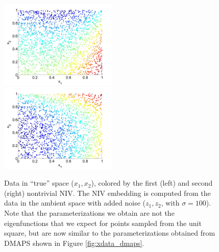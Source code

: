 \documentclass[12pt]{article}
\begin{document}
\begin{figure}[htb]
\includegraphics[width=0.5\textwidth]{xdata_noise2_colored_NIV1}
\includegraphics[width=0.5\textwidth]{xdata_noise2_colored_NIV2}
\caption{Data in ``true'' space ($x_1, x_2$), colored by the first (left) and second (right) nontrivial NIV. The NIV embedding is computed from the data in the ambient space with added noise ($z_1, z_2$, with $\sigma = 100$). Note that the parameterizations we obtain are not the eigenfunctions that we expect for points sampled from the unit square, but are now similar to the parameterizations obtained from DMAPS shown in Figure \ref{fig:xdata_dmaps}.}
\label{fig:xdata_NIV_noise2}
\end{figure}
\end{document}
